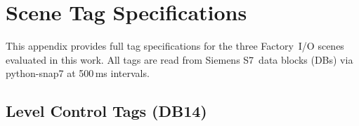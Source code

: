 \appendices

\section{Scene Tag Specifications}
\label{sec:appendix-tags}

This appendix provides full tag specifications for the three Factory~I/O scenes
evaluated in this work. All tags are read from Siemens S7~data blocks (DBs)
via python-snap7 at 500\,ms intervals.

\begin{table}[!t]
\centering
\caption{PLC tag summary for each evaluated scene. R/W indicates writable tags usable as attack targets.}
\label{tab:tag-summary}
\small
\setlength{\tabcolsep}{3pt}
\end{table}

\subsection{Level Control Tags (DB14)}
\label{subsec:appendix-tags-level}

